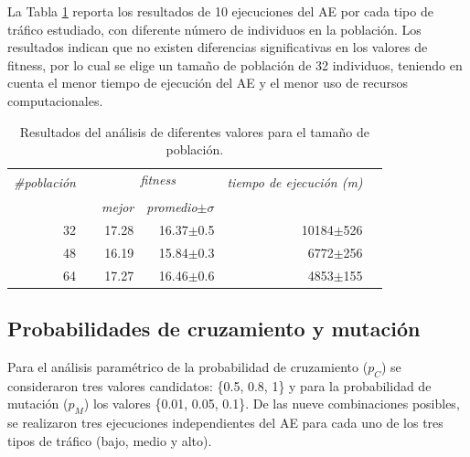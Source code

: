 La Tabla \ref{table:parametro_poblacion} reporta los resultados de 10 ejecuciones del AE por cada tipo de tráfico estudiado, con diferente número de individuos en la población. Los resultados 
indican que no existen diferencias significativas en los valores de fitness, por lo cual se elige un tamaño de población de 32 individuos, teniendo en cuenta el menor tiempo de ejecución del AE y el menor uso de recursos computacionales.

\begin{table}[!ht]
	\renewcommand{\arraystretch}{1.0}
\renewcommand{\tabcolsep}{8pt}
	\caption{Resultados del análisis de diferentes valores para el tamaño de población.}
	\label{table:parametro_poblacion}
	\centering
	\begin{tabular}{rrrrrp{2cm}}
		\toprule
		\multirow{2}{*}{\textit{\#población}}& &
		\multicolumn{2}{c}{\textit{fitness}} & \multirow{2}{*}{\textit{tiempo de ejecución (m)}} \\
		\cline{3-4} \\[-9pt]
		& & \textit{mejor}
		& \textit{promedio$\pm \sigma$}
		\\
		\midrule
		32 & & {17.28} & 16.37$\pm$0.5 & 10184$\pm$526\\
		48 & & {16.19} & 15.84$\pm$0.3 & 6772$\pm$256\\
		64 & & {17.27} & 16.46$\pm$0.6 & 4853$\pm$155\\
		\bottomrule
	\end{tabular}
\end{table}

\subsection{Probabilidades de cruzamiento y mutación}
Para el análisis paramétrico de la probabilidad de cruzamiento ($p_C$) se consideraron tres valores candidatos: \{0.5, 0.8, 1\} y para la probabilidad de mutación ($p_M$) los valores \{0.01,  0.05,  0.1\}. De las nueve combinaciones posibles, se realizaron tres ejecuciones independientes del AE para cada uno de los tres tipos de tráfico (bajo, medio y alto).  

